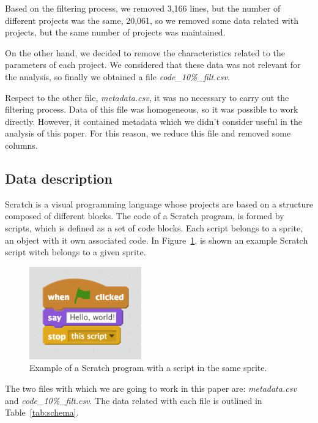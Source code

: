 \documentclass[a4paper,twocolumn,10pt]{article}
\begin{document}
Based on the filtering process, we removed 3,166 lines, but the number of
different projects was the same, 20,061, so we removed some data related with
projects, but the same number of projects was maintained.

On the other hand, we decided to remove the characteristics related to the
parameters of each project. We considered that these data was not relevant
for the analysis, so finally we obtained a file
\textit{code\_10\%\_filt.csv}.

Respect to the other file, \textit{metadata.csv}, it was no necessary to carry
out the filtering process. Data of this file was homogeneous, so it was
possible to work directly. However, it contained metadata which we didn't
consider useful in the analysis of this paper. For this reason, we reduce
this file and removed some columns.

\subsection{Data description}
\label{subsec:description}

Scratch is a visual programming language whose projects are based on a structure
composed of different blocks. The code of a Scratch program, is formed by scripts,
which is defined as a set of code blocks. Each script belongs to a sprite, an object
with it own associated code. In Figure~\ref{tab:scratch}, is shown an example
Scratch script witch belongs to a given sprite.

\begin{figure}
\begin{center}
\includegraphics[height=4cm]{images/scratch.png}
\caption{Example of a Scratch program with a script in the same sprite.}
\label{tab:scratch}
\end{center}
\end{figure}

The two files with which we are going to work in this paper are:
\textit{metadata.csv} and \textit{code\_10\%\_filt.csv}. 
The data related with each file is outlined in Table~\ref{tab:schema}.
\end{document}
